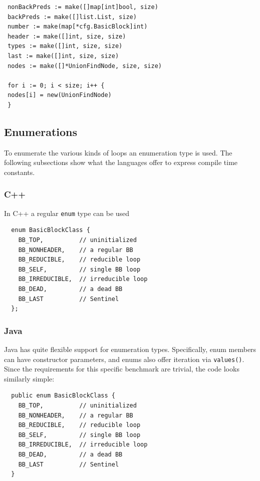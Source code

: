 \begin{footnotesize}
\begin{verbatim}
 nonBackPreds := make([]map[int]bool, size)
 backPreds := make([]list.List, size)
 number := make(map[*cfg.BasicBlock]int)
 header := make([]int, size, size)
 types := make([]int, size, size)
 last := make([]int, size, size)
 nodes := make([]*UnionFindNode, size, size)

 for i := 0; i < size; i++ {
 nodes[i] = new(UnionFindNode)
 }
\end{verbatim}
\end{footnotesize}






\subsection{Enumerations}

To enumerate the various kinds of loops an
enumeration type is used. The following subsections show
what the languages offer to express compile time constants.

\subsubsection{C++}
In C++ a regular {\tt enum} type can be used

\begin{footnotesize}
\begin{verbatim}
  enum BasicBlockClass {
    BB_TOP,          // uninitialized
    BB_NONHEADER,    // a regular BB
    BB_REDUCIBLE,    // reducible loop
    BB_SELF,         // single BB loop
    BB_IRREDUCIBLE,  // irreducible loop
    BB_DEAD,         // a dead BB
    BB_LAST          // Sentinel
  };
\end{verbatim}
\end{footnotesize}

\subsubsection{Java}

Java has quite flexible support for enumeration types. Specifically,
enum members can have constructor parameters, and enums also offer
iteration via {\tt values()}. Since the requirements for this
specific benchmark are trivial, the code
looks similarly simple:

\begin{footnotesize}
\begin{verbatim}
  public enum BasicBlockClass {
    BB_TOP,          // uninitialized
    BB_NONHEADER,    // a regular BB
    BB_REDUCIBLE,    // reducible loop
    BB_SELF,         // single BB loop
    BB_IRREDUCIBLE,  // irreducible loop
    BB_DEAD,         // a dead BB
    BB_LAST          // Sentinel
  }
\end{verbatim}
\end{footnotesize}


